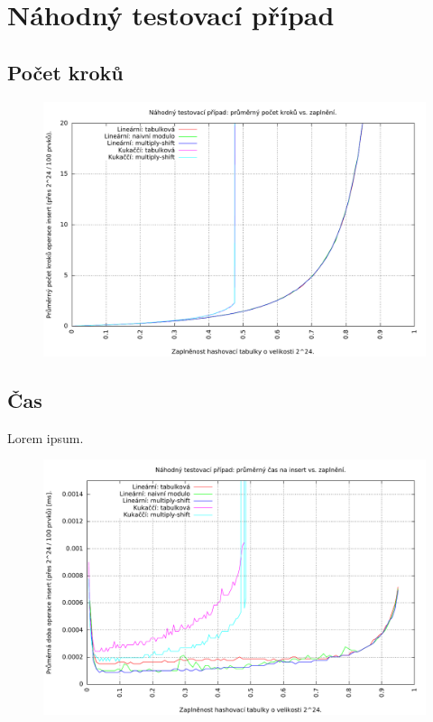 \documentclass[12pt,a4paper]{report}
\begin{document}
	
	\section{Náhodný testovací případ}
	\subsection{Počet kroků}
	\begin{figure}[h]	
		\centering	
		\includegraphics[scale=0.6]{graph_rand_steps}		
	\end{figure}


	\subsection{Čas}
	Lorem ipsum.
	\begin{figure}[h]	
	\centering	
	\includegraphics[scale=0.6]{graph_rand_time}		
	\end{figure}
	
\end{document}
